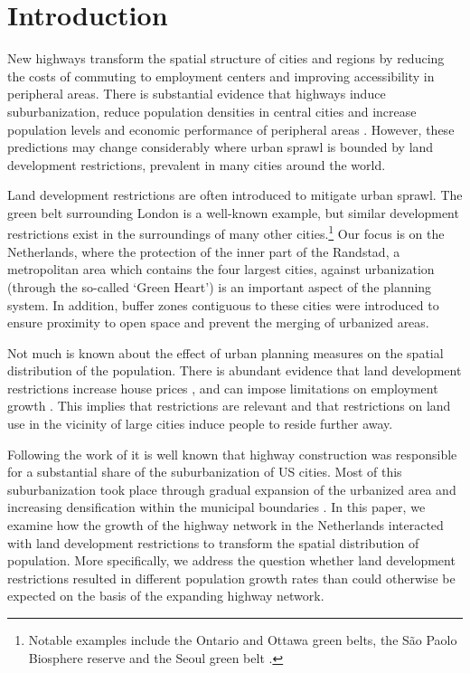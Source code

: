 \documentclass[a4paper,authoryear,review]{elsarticle}  	%
\begin{document}
\newpage	%
\section[Introduction]{Introduction}
	New highways transform the spatial structure of cities and regions by reducing the costs of commuting to employment centers and improving accessibility in peripheral areas. There is substantial evidence that highways induce suburbanization, reduce population densities in central cities and increase population levels and economic performance of peripheral areas \citep{Baum-Snow2007,Baum-Snow2007a,Chandra2000,Duranton2012b,Garcia-Lopez2015}. However, these predictions may change considerably where urban sprawl is bounded by land development restrictions, prevalent in many cities around the world. 
	
	Land development restrictions are often introduced to mitigate urban sprawl. The green belt surrounding London is a well-known example, but similar development restrictions exist in the surroundings of many other cities.\footnote{Notable examples include the Ontario and Ottawa green belts, the São Paolo Biosphere reserve and the Seoul green belt \citep{Jun2001}.} Our focus is on the Netherlands, where the protection of the inner part of the Randstad, a metropolitan area which contains the four largest cities, against urbanization (through the so-called ‘Green Heart’) is an important aspect of the planning system. In addition, buffer zones contiguous to these cities were introduced to ensure proximity to open space and prevent the merging of urbanized areas. 
	
	Not much is known about the effect of urban planning measures on the spatial distribution of the population. There is abundant evidence that land development restrictions increase house prices \citep{Glaeser2006,Kok2014}, and can impose limitations on employment growth \citep{Hsieh2017}. This implies that restrictions are relevant and that restrictions on land use in the vicinity of large cities induce people to reside further away. 
	
	Following the work of \citet{Baum-Snow2007} it is well known that highway construction was responsible for a substantial share of the suburbanization of US cities. Most of this suburbanization took place through gradual expansion of the urbanized area and increasing densification within the municipal boundaries \citep{Burchfield2006x}. In this paper, we examine how the growth of the highway network in the Netherlands interacted with land development restrictions to transform the spatial distribution of population. More specifically, we address the question whether land development restrictions resulted in different population growth rates than could otherwise be expected on the basis of the expanding highway network. 
	
\end{document}
